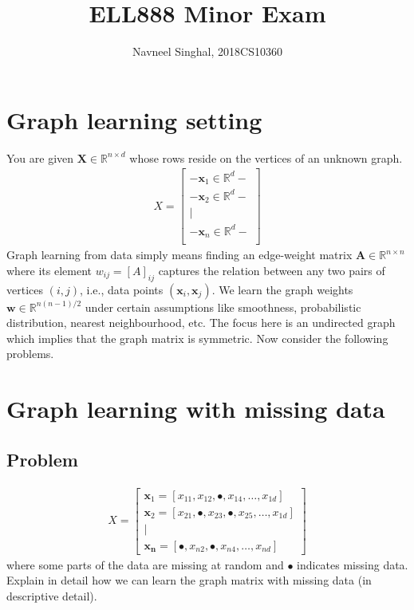 \documentclass[a4paper]{article}
\title{\textbf{ELL888 Minor Exam}}
\author{Navneel Singhal, 2018CS10360}
\date{}
\newcommand{\mf}{\mathbf}
\newcommand{\R}{\mathbb{R}}
\begin{document}
\maketitle
\tableofcontents

\section{Graph learning setting}

You are given $\mf{X} \in \R^{n \times d}$ whose rows reside on the vertices of an unknown graph.
\begin{align*}
    X = \begin{bmatrix}
        - \mf{x}_1 \in \R^d -\\
        - \mf{x}_2 \in \R^d -\\
            \mid \\
        - \mf{x}_n \in \R^d -\\
    \end{bmatrix}
\end{align*}
Graph learning from data simply means finding an edge-weight matrix $\mf{A} \in \R^{n \times n}$ where its element $w_{ij} = {[A]}_{ij}$ captures the relation between any two pairs of vertices $(i,
j)$, i.e., data points $(\mf{x}_i, \mf{x}_j)$. We learn the graph weights $\mf{w} \in \R^{n(n - 1)/2}$ under certain assumptions like smoothness, probabilistic distribution, nearest
neighbourhood, etc. The focus here is an undirected graph which implies that the graph matrix is symmetric. Now consider the following problems.

\section{Graph learning with missing data}

\subsection{Problem}
\begin{align*}
    X = \begin{bmatrix}
        \mf{x}_1 = [x_{11}, x_{12}, \bullet, x_{14}, \ldots, x_{1d}]\\
        \mf{x}_2 = [x_{21}, \bullet, x_{23}, \bullet, x_{25}, \ldots, x_{1d}]\\
        \mid\\
        \mf{x_n} = [\bullet, x_{n2}, \bullet, x_{n4}, \ldots, x_{nd}]
    \end{bmatrix}
\end{align*}
where some parts of the data are missing at random and $\bullet$ indicates missing data. Explain in detail how we can learn the graph matrix with missing data (in descriptive detail).
\end{document}
